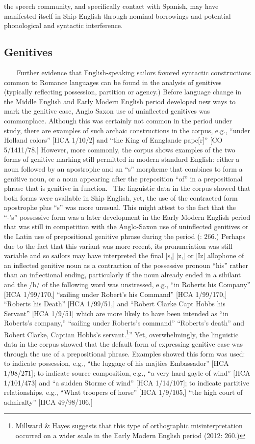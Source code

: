 the speech community, and specifically contact with Spanish, may have manifested itself in Ship English through nominal borrowings and potential phonological and syntactic interference. ~

\subsection{\textbf{Genitives}}%

~~~   Further evidence that English-speaking sailors favored syntactic constructions common to Romance languages can be found in the analysis of genitives (typically reflecting possession, partition or agency.) Before language change in the Middle English and Early Modern English period developed new ways to mark the genitive case, Anglo Saxon use of uninflected genitives was commonplace. Although this was certainly not common in the period under study, there are examples of such archaic constructions in the corpus, e.g., “under Holland colors” [HCA 1/10/2] and “the King of Ennglande pape[r]” [CO 5/1411/78.] However, more commonly, the corpus shows examples of the two forms of genitive marking still permitted in modern standard English: either a noun followed by an apostrophe and an “s” morpheme that combines to form a genitive noun, or a noun appearing after the preposition “of” in a prepositional phrase that is genitive in function. ~The linguistic data in the corpus showed that both forms were available in Ship English, yet, the use of the contracted form apostrophe plus “s” was more unusual. This might attest to the fact that the “-’s” possessive form was a later development in the Early Modern English period that was still in competition with the Anglo-Saxon use of uninflected genitives or the Latin use of prepositional genitive phrase during the period (\citealt{Milward1996}: 266.) Perhaps due to the fact that this variant was more recent, its pronunciation was still variable and so sailors may have interpreted the final [s,] [z,] or [Iz] allophone of an inflected genitive noun as a contraction of the possessive pronoun “his” rather than an inflectional ending, particularly if the noun already ended in a sibilant and the /h/ of the following word was unstressed, e.g., “in Roberts his Company” [HCA 1/99/170,] “sailing under Robert’s his Command” [HCA 1/99/170,] “Roberts his Death” [HCA 1/99/51,] and “Robert Clarke Capt Hobbs his Servant” [HCA 1/9/51] which are more likely to have been intended as “in Roberts’s company,” “sailing under Roberts’s command” “Roberts’s death” and Robert Clarke, Captian Hobbs’s servant.\footnote{Millward \& Hayes suggests that this type of orthographic misinterpretation occurred on a wider scale in the Early Modern English period (2012: 260.)}” Yet, overwhelmingly, the linguistic data in the corpus showed that the default form of expressing genitive case was through the use of a prepositional phrase. Examples showed this form was used: to indicate possession, e.g., “the luggage of his majties Embassador” [HCA 1/98/271]; to indicate source composition, e.g., “a very hard gayle of wind” [HCA 1/101/473] and “a sudden Storme of wind” [HCA 1/14/107]; to indicate partitive relationships, e.g., “What troopers of horse” [HCA 1/9/105,] “the high court of admiralty” [HCA 49/98/106,] 